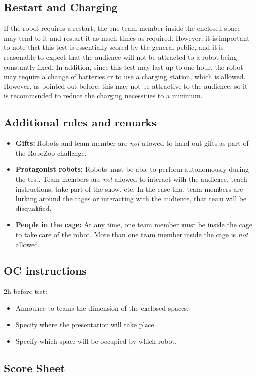 \subsection{Restart and Charging}
If the robot requires a restart, the one team member inside the enclosed space may tend to it and restart it as much times as required. However, it is important to note that this test is essentially scored by the general public, and it is reasonable to expect that the audience will not be attracted to a robot being constantly fixed. In addition, since this test may last up to one hour, the robot may require a change of batteries or to use a charging station, which is allowed. However, as pointed out before, this may not be attractive to the audience, so it is recommended to reduce the charging necessities to a minimum. 

\subsection{Additional rules and remarks}

\begin{itemize}
\item \textbf{Gifts:} Robots and team member are \emph{not} allowed to hand out gifts as part of the RoboZoo challenge. 
\item \textbf{Protagonist robots:} Robots must be able to perform autonomously during the test. Team members are \emph{not} allowed to interact with the audience, teach instructions, take part of the show, etc. In the case that team members are lurking around the cages or interacting with the audience, that team will be disqualified.
\item \textbf{People in the cage:} At any time, one team member must be inside the cage to take care of the robot. More than one team member inside the cage is \emph{not} allowed.
\end{itemize}

\subsection{OC instructions}

2h before test:
\begin{itemize}
\item{Announce to teams the dimension of the enclosed spaces.}
\item{Specify where the presentation will take place.}
\item{Specify which space will be occupied by which robot.}
\end{itemize}

\subsection{Score Sheet}



